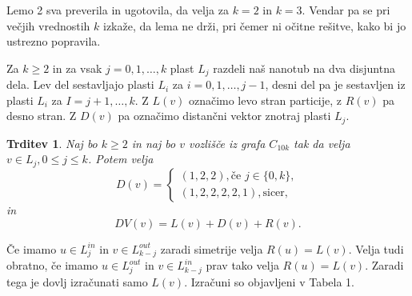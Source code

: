 \documentclass[a4paper, 12pt]{article}
\newtheorem{trditev}{Trditev}[section]
\begin{document}
Lemo 2 sva preverila in ugotovila, da velja za $k=2$ in $k=3$. Vendar pa se pri večjih vrednostih $k$ izkaže, da lema ne drži, pri čemer ni očitne rešitve, kako bi jo ustrezno popravila.

Za $k \geq 2$ in za vsak $j=0,1, \dots , k$ plast $L_j$ razdeli naš nanotub na dva disjuntna dela. Lev del sestavljajo plasti $L_i$ za $i = 0,1,\dots , j-1$, desni
 del pa je sestavljen iz plasti $L_i$ za $I = j+1, \dots, k$. Z $L(v)$ označimo levo stran particije, z $R(v)$ pa desno stran. Z $D(v)$ pa označimo distančni vektor znotraj plasti $L_j$.

\begin{trditev}
    Naj bo $k \geq 2$ in naj bo $v$ vozlišče iz grafa $C_{10k}$ tak da velja $v \in L_j, 0 \leq j \leq k$. Potem velja
    $$
    D(v) = \begin{cases}
            (1,2,2), \text{če } j \in \{0, k \}, \\
            (1,2,2,2,2,1), \text{sicer}, 
            \end{cases}
    $$
    in 
    $$
            DV(v) = L(v) + D(v) + R(v).
    $$

\end{trditev}

Če imamo $u \in L_j^{in}$ in $v \in L_{k-j}^{out}$ zaradi simetrije velja $R(u) = L(v)$. Velja tudi obratno, če imamo $u \in L_j^{out}$ in 
$v \in L_{k-j}^{in}$ prav tako velja $R(u) = L(v)$. Zaradi tega je dovlj izračunati samo $L(v)$. Izračuni so objavljeni v Tabela 1.
\end{document}
